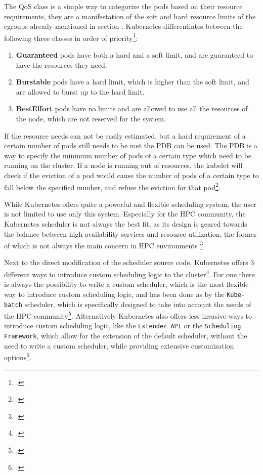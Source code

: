 The \ac{QoS} class is a simple way to categorize the pods based on their resource requirements,
they are a manifestation of the soft and hard resource limits of the cgroups already mentioned in section .
Kubernetes differentiates between the following three classes in order of priority\footcite{matiasnicolettiUnderstandingKubernetesPod2023}:

\begin{enumerate}
    \item \textbf{Guaranteed} pods have both a hard and a soft limit, and are guaranteed to have the resources they need.
    \item \textbf{Burstable} pods have a hard limit, which is higher than the soft limit, and are allowed to burst up to the hard limit.
    \item \textbf{BestEffort} pods have no limits and are allowed to use all the resources of the node, which are not reserved for the system.
\end{enumerate}

If the resource needs can not be easily  estimated, but a hard requirement of a certain number of pods still needs to be met
the \ac{PDB} can be used.
The \ac{PDB} is a way to specify the minimum number of pods of a certain type which need to be running on the cluster.
If a node is running out of resources, the kubelet will check if the eviction of a pod would cause the number of pods of a certain type to fall below the specified number,
and refuse the eviction for that pod\footcite{matiasnicolettiUnderstandingKubernetesPod2023}.

While Kubernetes offers quite a powerful and flexible scheduling system, the user is not limited to use only this system.
Especially for the \ac{HPC} community, the Kubernetes scheduler is not always the best fit, as its design is geared towards the
balance between high availability services and resource utilization, the former of which is not always the main concern in \ac{HPC} environments \footcite{misaleStandardKubernetesScheduling2022}.

Next to the direct modification of the scheduler source code, Kubernetes offers  3 different ways
to introduce custom scheduling logic to the cluster\footcite{rejibaCustomSchedulingKubernetes2023}.
For one there is always the possibility to write a custom scheduler, which is the most flexible way to introduce custom scheduling logic,
and has been done as by the \texttt{Kube-batch} scheduler, which is specifically designed to take into account the needs of the \ac{HPC} community\footcite{kubernetes-docsKubernetesretiredKubebatch2024}.
Alternatively Kubernetes also offers less invasive ways to introduce custom scheduling logic, like the \texttt{Extender API} or the \texttt{Scheduling Framework},
which allow for the extension of the default scheduler, without the need to write a custom scheduler, while providing extensive customization options\footcite{kubernetes-docsSchedulingFramework}.


\pagebreak